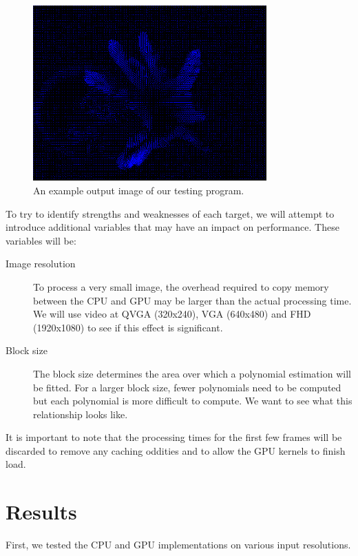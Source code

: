 \documentclass[12pt,letterpaper]{article}
\begin{document}
\begin{figure}[h]
  \centering
  \includegraphics[width=0.8\textwidth]{flow.png}
  \caption{An example output image of our testing program.}
\end{figure}

To try to identify strengths and weaknesses of each target, we will attempt to
introduce additional variables that may have an impact on performance. These
variables will be:

\begin{description}
  \item[Image resolution] To process a very small image, the overhead required
    to copy memory between the CPU and GPU may be larger than the actual
    processing time. We will use video at QVGA (320x240), VGA (640x480) and FHD
    (1920x1080) to see if this effect is significant.
  \item[Block size] The block size determines the area over which a polynomial
    estimation will be fitted. For a larger block size, fewer polynomials need
    to be computed but each polynomial is more difficult to compute. We want to
    see what this relationship looks like.
\end{description}

It is important to note that the processing times for the first few frames will
be discarded to remove any caching oddities and to allow the GPU kernels to
finish load.

\section{Results}

First, we tested the CPU and GPU implementations on various input resolutions.
\end{document}
